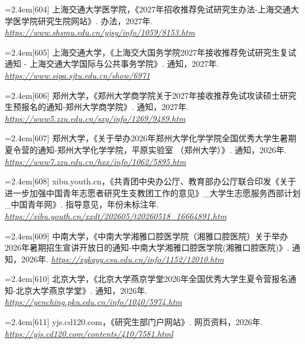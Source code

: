 {\par\noindent\hangindent=2.4em\label{src:S0391}{\color{cAccent}[604]} 上海交通大学医学院，《2027年招收推荐免试研究生办法-上海交通大学医学院研究生院网站》. 办法，2027年. \textit{\url{https://www.shsmu.edu.cn/yjsy/info/1059/8153.htm}}\par
\par\noindent\hangindent=2.4em\label{src:S0393}{\color{cAccent}[605]} 上海交通大学，《上海交大国务学院2027年接收推荐免试研究生复试通知 - 上海交通大学国际与公共事务学院》. 通知，2027年. \textit{\url{https://www.sipa.sjtu.edu.cn/show/6971}}\par
\par\noindent\hangindent=2.4em\label{src:S0397}{\color{cAccent}[606]} 郑州大学，《郑州大学商学院关于2027年接收推荐免试攻读硕士研究生预报名的通知-郑州大学商学院》. 通知，2027年. \textit{\url{https://www5.zzu.edu.cn/sxy/info/1269/9489.htm}}\par
\par\noindent\hangindent=2.4em\label{src:S0398}{\color{cAccent}[607]} 郑州大学，《关于举办2026年郑州大学化学学院全国优秀大学生暑期夏令营的通知-郑州大学化学学院，平原实验室 （郑州大学）》. 通知，2026年. \textit{\url{https://www7.zzu.edu.cn/hxx/info/1062/5895.htm}}\par
\par\noindent\hangindent=2.4em\label{src:S0400}{\color{cAccent}[608]} xibu.youth.cn，《共青团中央办公厅、教育部办公厅联合印发《关于进一步加强中国青年志愿者研究生支教团工作的意见》\_大学生志愿服务西部计划\_中国青年网》. 指导意见，年份未标注年. \textit{\url{https://xibu.youth.cn/xxdt/202605/t20260518_16664891.htm}}\par
\par\noindent\hangindent=2.4em\label{src:S0405}{\color{cAccent}[609]} 中南大学，《中南大学湘雅口腔医学院（湘雅口腔医院）关于举办2026年暑期招生宣讲开放日的通知-中南大学湘雅口腔医学院(湘雅口腔医院)》. 通知，2026年. \textit{\url{https://xykqyy.csu.edu.cn/info/1152/12010.htm}}\par
\par\noindent\hangindent=2.4em\label{src:S0406}{\color{cAccent}[610]} 北京大学，《北京大学燕京学堂2026年全国优秀大学生夏令营报名通知-北京大学燕京学堂》. 通知，2026年. \textit{\url{https://yenching.pku.edu.cn/info/1040/5974.htm}}\par
\par\noindent\hangindent=2.4em\label{src:S0407}{\color{cAccent}[611]} yjs.cd120.com，《研究生部门户网站》. 网页资料，2026年. \textit{\url{https://yjs.cd120.com/contents/410/7581.html}}\par
}
